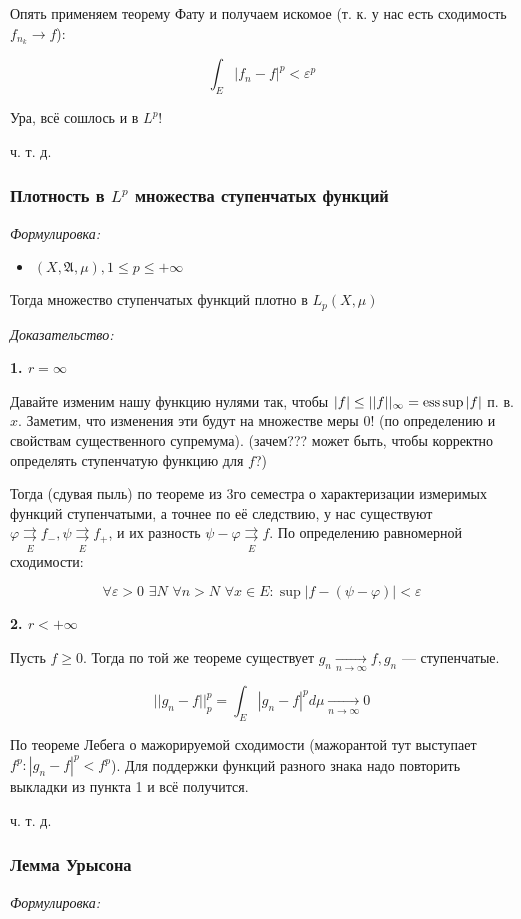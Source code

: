 \documentclass{article}
\def\dbl{\,\,}
\def\rsh#1{\underset{#1}{\rightrightarrows}}
\def\rshe{\rsh{E}}
\def\goesto#1{\underset{#1}{\longrightarrow}}
\def\toinf#1{\goesto{#1 \rightarrow \infty}}
\def\ntoinf{\toinf{n}}
\begin{document}
Опять применяем теорему Фату и получаем искомое (т. к. у нас есть сходимость $f_{n_k} \rightarrow f$):

\[\int_{E} |f_n - f|^p < \varepsilon^p\]

Ура, всё сошлось и в $L^p$!

ч. т. д. 

\subsubsection{Плотность в $L^p$ множества ступенчатых функций}
\textit{Формулировка:}

\begin{itemize}
    \item $(X, \mathfrak{A}, \mu), 1 \le p \le +\infty$
\end{itemize}

Тогда множество ступенчатых функций плотно в $L_p(X, \mu)$

\textit{Доказательство:}

\textbf{1. $r = \infty$}

Давайте изменим нашу функцию нулями так, чтобы $|f| \le ||f||_{\infty} = \operatorname*{ess\,sup} |f|$ п. в. $x$. Заметим, что изменения эти будут на множестве меры 0! (по определению и свойствам существенного супремума). (зачем??? может быть, чтобы корректно определять ступенчатую функцию для $f$?)

Тогда (сдувая пыль) по теореме из 3го семестра о характеризации измеримых функций ступенчатыми, а точнее по её следствию, у нас существуют $\varphi \rshe f_-, \psi \rshe f_+$, и их разность $\psi - \varphi \rshe f$. По определению равномерной сходимости:

\[\forall \varepsilon > 0 \dbl \exists N \dbl \forall n > N \dbl \forall x \in E: \sup |f - (\psi - \varphi)| < \varepsilon\]

\textbf{2. $r < +\infty$}

Пусть $f \ge 0$. Тогда по той же теореме существует $g_n \ntoinf f, g_n$ --- ступенчатые.

\[||g_n - f||_p^p = \int_{E} |g_n - f| ^p d\mu \ntoinf 0\]

По теореме Лебега о мажорируемой сходимости (мажорантой тут выступает $f^p: |g_n - f|^p < f^p$). Для поддержки функций разного знака надо повторить выкладки из пункта 1 и всё получится.

ч. т. д. 

\subsubsection{Лемма Урысона}
\textit{Формулировка:}
\end{document}

